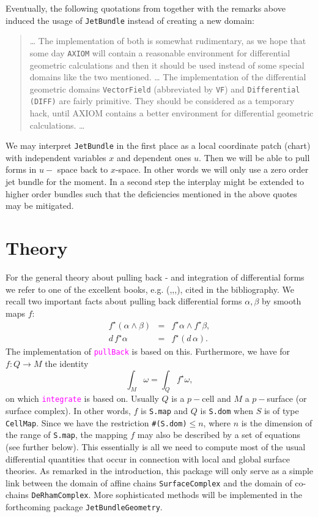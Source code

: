\documentclass[12pt,a4paper]{article}
\newcommand{\spadfun}[1]{\textcolor{magenta}{\tt #1}}
\begin{document}
Eventually, the following quotations from \cite{wms:axiom} together
with the remarks above induced the usage of {\tt JetBundle}
instead of creating a new domain:
%
\begin{verse}
\ldots
The implementation of both is somewhat rudimentary, as we hope that some
day {\tt AXIOM} will contain a reasonable environment for differential 
geometric calculations and then it should be used instead of some 
special domains like the two mentioned. 
\ldots
The implementation of the differential geometric domains  {\tt VectorField} 
(abbreviated by {\tt VF}) and {\tt Differential (DIFF)} are fairly primitive. 
They should be considered as a temporary hack, until AXIOM contains 
a better environment for differential geometric calculations.
\ldots
\end{verse}  
%
We may interpret {\tt JetBundle} in the first place as a local
coordinate patch (chart) with independent variables $x$ and
dependent ones $u$. Then we will be able to pull forms in $u-$
space back to $x$-space. In other words we will only use a 
zero order jet bundle for the moment. In a second step the
interplay might be extended to higher order bundles such that
the deficiencies mentioned in the above quotes may be mitigated.
%
\section{Theory}
For the general theory about pulling back - and integration of
differential forms we refer to one of the excellent books, e.g.
(\cite{FLAN},\cite{SPV},\cite{MTAA},\cite{CART}), cited in the 
bibliography.
We recall two important facts about pulling back differential
forms $\alpha,\beta$ by smooth maps $f$:
\begin {eqnarray*}
   f^\star (\alpha\wedge\beta) &=& f^\star\alpha\wedge f^\star\beta,\\
   d\, f^\star\alpha &=& f^\star (d\,\alpha). 
\end {eqnarray*} 
The implementation of \spadfun{pullBack} is based on this.
Furthermore, we have for $f:Q \rightarrow M$ the identity
\begin{displaymath}
   \int_{M} \omega = \int_Q f^\star \omega,
\end{displaymath}
on which \spadfun{integrate} is based on. Usually $Q$ is a 
$p-$cell and $M$ a $p-$surface (or surface complex). In other
words, $f$ is {\tt S.map} and $Q$ is {\tt S.dom} when $S$ is
of type {\tt CellMap}.
Since we have the restriction {\tt \#(S.dom)}$\leq n$, where $n$
is the dimension of the range of {\tt S.map}, the mapping $f$
may also be described by a set of equations (see further below).
This essentially is all we need to compute most of the usual
differential quantities that occur in connection with local and
global surface theories. As remarked in the introduction, this
package will only serve as a simple link between the domain of
affine chains {\tt SurfaceComplex} and the domain of co-chains
{\tt DeRhamComplex}. More sophisticated methods will be 
implemented in the forthcoming package {\tt JetBundleGeometry}. 
%
\end{document}
